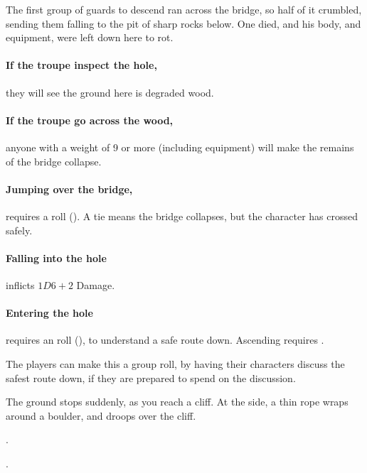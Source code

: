 \begin{multicols}{2}
\begin{exampletext}
  The first group of \glspl{guard} to descend ran across the bridge, so half of it crumbled, sending them falling to the pit of sharp rocks below.
  One died, and his body, and equipment, were left down here to rot.
\end{exampletext}

\paragraph{If the troupe inspect the hole,}
they will see the ground here is degraded wood.

\paragraph{If the troupe go across the wood,}
anyone with a \gls{weight} of 9 or more (including equipment) will make the remains of the bridge collapse.

\paragraph{Jumping over the bridge,}
requires a  roll (\tn[9]).
A tie means the bridge collapses, but the character has crossed safely.

\paragraph{Falling into the hole}
inflicts $1D6+2$ Damage.

\paragraph{Entering the hole}
requires an  roll (\tn[10]), to understand a safe route down.
Ascending requires \tn[12].

The players can make this a group roll, by having their characters discuss the safest route down, if they are prepared to spend  on the discussion.

\begin{boxtext}
  The ground stops suddenly, as you reach a cliff.
  At the side, a thin rope wraps around a boulder, and droops over the cliff.
\end{boxtext}

.

.



\end{multicols}
